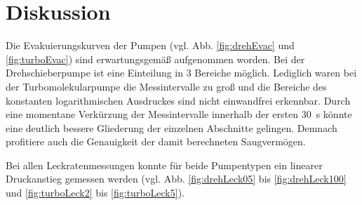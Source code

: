 \section{Diskussion}
\label{sec:Diskussion}
Die Evakuierungskurven der Pumpen (vgl. Abb. \ref{fig:drehEvac} und \ref{fig:turboEvac}) sind erwartungsgemäß aufgenommen worden.
Bei der Drehschieberpumpe ist eine Einteilung in 3 Bereiche möglich.
Lediglich waren bei der Turbomolekularpumpe die Messintervalle zu groß und die Bereiche des konstanten logarithmischen Ausdruckes sind nicht einwandfrei erkennbar.
Durch eine momentane Verkürzung der Messintervalle innerhalb der ersten \qty{30}{\second} könnte eine deutlich bessere Gliederung der einzelnen Abschnitte gelingen.
Demnach profitiere auch die Genauigkeit der damit berechneten Saugvermögen.

Bei allen Leckratenmessungen konnte für beide Pumpentypen ein linearer Druckanstieg gemessen werden 
(vgl. Abb. \ref{fig:drehLeck05} bis \ref{fig:drehLeck100} und \ref{fig:turboLeck2} bis \ref{fig:turboLeck5}).

